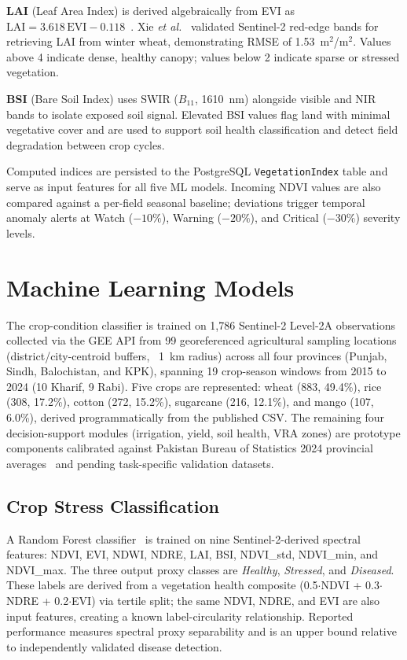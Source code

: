 \documentclass[conference]{IEEEtran}
\begin{document}
\textbf{LAI} (Leaf Area Index) is derived algebraically from EVI as
$\mathrm{LAI} = 3.618\,\mathrm{EVI} - 0.118$~\cite{xie2019}. Xie
\textit{et al.}~\cite{xie2019} validated Sentinel-2 red-edge bands for
retrieving LAI from winter wheat, demonstrating RMSE of 1.53~m$^2$/m$^2$.
Values above 4 indicate dense, healthy canopy; values below 2 indicate sparse
or stressed vegetation.

\textbf{BSI} (Bare Soil Index) uses SWIR ($B_{11}$, 1610~nm) alongside visible
and NIR bands to isolate exposed soil signal. Elevated BSI values flag land with
minimal vegetative cover and are used to support soil health classification and
detect field degradation between crop cycles.

Computed indices are persisted to the PostgreSQL \texttt{VegetationIndex} table
and serve as input features for all five ML models. Incoming NDVI values are
also compared against a per-field seasonal baseline; deviations trigger temporal
anomaly alerts at Watch ($-10\%$), Warning ($-20\%$), and Critical ($-30\%$)
severity levels.

\section{Machine Learning Models}

The crop-condition classifier is trained on 1,786 Sentinel-2 Level-2A
observations collected via the GEE API from 99 georeferenced agricultural
sampling locations (district/city-centroid buffers, ~1~km radius) across all
four provinces (Punjab, Sindh, Balochistan, and KPK), spanning 19 crop-season
windows from 2015 to 2024 (10 Kharif, 9 Rabi). Five crops are represented:
wheat (883, 49.4\%), rice (308, 17.2\%), cotton (272, 15.2\%), sugarcane
(216, 12.1\%), and mango (107, 6.0\%), derived programmatically from the
published CSV. The remaining four decision-support modules (irrigation,
yield, soil health, VRA zones) are prototype components calibrated against
Pakistan Bureau of Statistics 2024 provincial averages~\cite{pbs2024}
and pending task-specific validation datasets.

\subsection{Crop Stress Classification}

A Random Forest classifier~\cite{breiman2001} is trained on nine
Sentinel-2-derived spectral features: NDVI, EVI, NDWI, NDRE, LAI, BSI,
NDVI\_std, NDVI\_min, and NDVI\_max. The three output proxy classes are
\textit{Healthy}, \textit{Stressed}, and \textit{Diseased}. These labels
are derived from a vegetation health composite (0.5$\cdot$NDVI +
0.3$\cdot$NDRE + 0.2$\cdot$EVI) via tertile split; the same NDVI, NDRE, and
EVI are also input features, creating a known label-circularity relationship.
Reported performance measures spectral proxy separability and is an upper bound
relative to independently validated disease detection.
\end{document}
